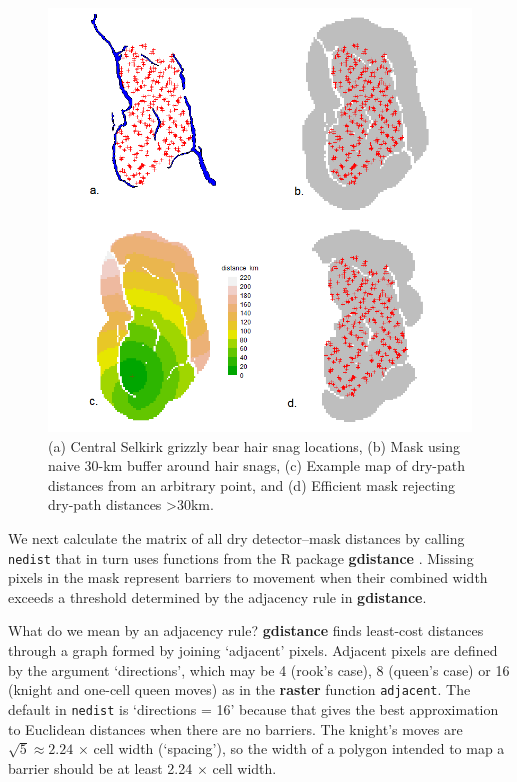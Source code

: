 \documentclass[
]{book}
\begin{document}
\begin{figure}
\includegraphics[width=0.95\linewidth]{figures/nefig} \caption{(a) Central Selkirk grizzly bear hair snag locations, (b) Mask using naive 30-km buffer around hair snags, (c) Example map of dry-path distances from an arbitrary point, and (d) Efficient mask rejecting dry-path distances >30km.}\label{fig:nefig}
\end{figure}

We next calculate the matrix of all dry detector--mask distances by calling \texttt{nedist} that in turn uses functions from the R package \textbf{gdistance} \citep{R-gdistance}. Missing pixels in the mask represent barriers to movement when their combined width exceeds a threshold determined by the adjacency rule in \textbf{gdistance}.

What do we mean by an adjacency rule? \textbf{gdistance} finds least-cost distances through a graph formed by joining `adjacent' pixels. Adjacent pixels are defined by the argument `directions', which may be 4 (rook's case), 8 (queen's case) or 16 (knight and one-cell queen moves) as in the \textbf{raster} function \texttt{adjacent}. The default in \texttt{nedist} is `directions = 16' because that gives the best approximation to Euclidean distances when there are no barriers. The knight's moves are \(\sqrt 5 \approx 2.24\) \(\times\) cell width (`spacing'), so the width of a polygon intended to map a barrier should be at least 2.24 \(\times\) cell width.
\end{document}
